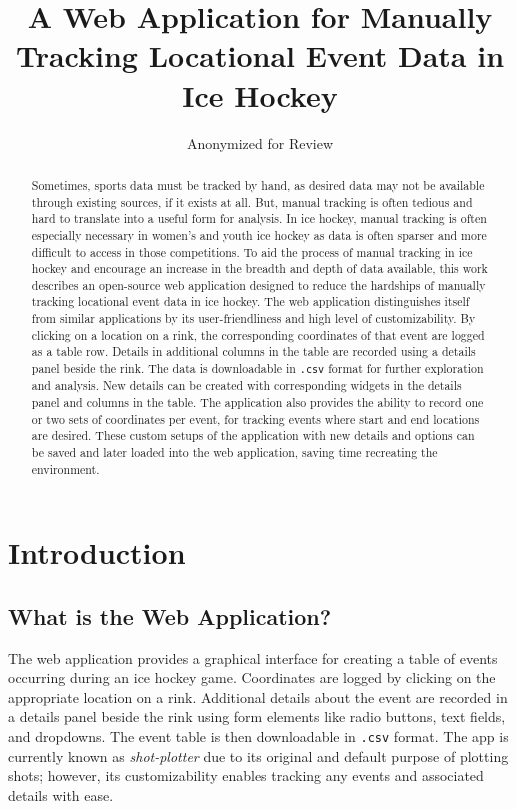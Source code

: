 \documentclass[letterpaper]{article}
\title{A Web Application for Manually Tracking Locational Event Data in Ice Hockey}
\author{Anonymized for Review}
\date{}
\begin{document}
\maketitle

\begin{abstract}
Sometimes, sports data must be tracked by hand, as desired data may not be available through existing sources, if it exists at all. But, manual tracking is often tedious and hard to translate into a useful form for analysis. In ice hockey, manual tracking is often especially necessary in women’s and youth ice hockey as data is often sparser and more difficult to access in those competitions. To aid the process of manual tracking in ice hockey and encourage an increase in the breadth and depth of data available, this work describes an open-source web application designed to reduce the hardships of manually tracking locational event data in ice hockey. The web application distinguishes itself from similar applications by its user-friendliness and high level of customizability. By clicking on a location on a rink, the corresponding coordinates of that event are logged as a table row. Details in additional columns in the table are recorded using a details panel beside the rink. The data is downloadable in \texttt{.csv} format for further exploration and analysis. New details can be created with corresponding widgets in the details panel and columns in the table. The application also provides the ability to record one or two sets of coordinates per event, for tracking events where start and end locations are desired. These custom setups of the application with new details and options can be saved and later loaded into the web application, saving time recreating the environment.
\end{abstract}

\section{Introduction}
\subsection{What is the Web Application?}
The web application provides a graphical interface for creating a table of events occurring during an ice hockey game. Coordinates are logged by clicking on the appropriate location on a rink. Additional details about the event are recorded in a details panel beside the rink using form elements like radio buttons, text fields, and dropdowns. The event table is then downloadable in \texttt{.csv} format. The app is currently known as \textit{shot-plotter} due to its original and default purpose of plotting shots; however, its customizability enables tracking any events and associated details with ease.
\end{document}
